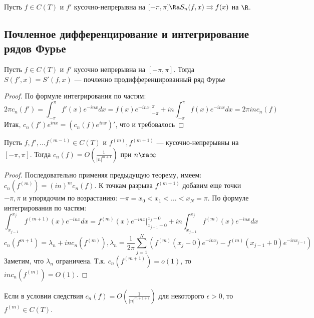 \begin{corollary}
    Пусть \(f \in C(T)\) и \(f'\) кусочно-непрерывна на \([-\pi, \pi] \Ra S_n(f, x) \rightrightarrows f(x)\) на \(\R\).
\end{corollary}

\subsection{Почленное дифференцирование и интегрирование рядов Фурье}

\begin{theorem}
    Пусть \(f \in C(T)\) и \(f'\) кусочно непрерывна на \([-\pi, \pi]\). Тогда \(S(f', x) = S'(f, x)\) --- почленно продифференцированный ряд Фурье
\end{theorem}
\begin{proof}
    По формуле интегрирования по частям:
    \[2\pi c_n(f') = \int_{-\pi}^{\pi} f'(x)e^{-inx}dx = f(x)e^{-inx}|_{-\pi}^\pi + in \int_{-\pi}^\pi f(x)e^{-inx}dx = 2\pi i n c_n(f)\]
    Итак, \(c_n(f')e^{inx} = (c_n(f)e^{inx})'\), что и требовалось
\end{proof}

\begin{corollary}
    Пусть \(f, f', \dots f^{(m - 1)} \in C(T)\) и \(f^{(m)}, f^{(m + 1)}\) --- кусочно-непрерывны на \([-\pi, \pi]\). Тогда \(c_n(f) = O\left( \frac{1}{|n|^{m + 1}} \right)\) при \(n \ra \infty\)
\end{corollary}
\begin{proof}
    Последовательно применяя предыдущую теорему, имеем: \(c_n(f^{(m)}) = (in)^m c_n(f)\). К точкам разрыва \(f^{(m + 1)}\) добавим еще точки \(-\pi , \pi\) и упорядочим по возрастанию: \(-\pi = x_0 < x_1 < \dots < x_N = \pi\). По формуле интегрирования по частям:
    \[\int_{x_{j - 1}}^{x_j} f^{(m + 1)}(x)e^{-inx}dx = f^{(m)}(x)e^{-inx}|^{x_j - 0}_{x_{j - 1} + 0} + in\int_{x_{j - 1}}^{x_j}f^{(m)}(x) e^{-inx}dx\]
    \[c_n(f^{m + 1}) = \lambda_n + inc_n(f^{(m)}), \lambda_n = \frac{1}{2\pi}\sum_{j = 1}^N \left(f^{(m)}(x_j - 0)e^{-inx_j} - f^{(m)}(x_{j - 1} + 0)e^{-inx_{j - 1}}\right)\]
    Заметим, что \(\lambda_n\) ограничена. Т.к. \(c_n(f^{(m + 1)}) = o(1)\), то \(inc_n(f^{(m)}) = O(1)\).
\end{proof}

\begin{problem}
    Если в условии следствия \(c_n(f) = O\left( \frac{1}{|n|^{m + 1 + \epsilon}} \right)\) для некоторого \(\epsilon > 0\), то \(f^{(m)} \in C(T)\).
\end{problem}

